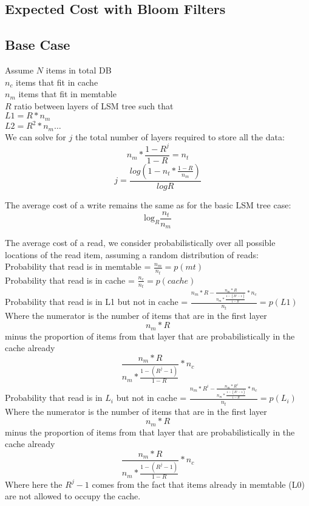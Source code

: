 \documentclass[11pt]{article}
\theoremstyle{plain}
\theoremstyle{definition}
\begin{document}
\subsection{Expected Cost with Bloom Filters}
\subsection{Base Case}

Assume
$N$ items in total DB \\
$n_c$ items that fit in cache\\
$n_m$ items that fit in memtable\\
$R$ ratio between layers of LSM tree such that \\
$L1 = R * n_m$ \\
$L2 = R^2 * n_m \dots$ \\ 

We can solve for $j$ the total number of layers required to store all the data: \\
$$n_m * \frac{1-R^j}{1-R} = n_t$$
$$j = \frac{log(1-n_t*\frac{1-R}{n_m})}{log R}$$

The average cost of a write remains the same as for the basic LSM tree case:
$$
\textrm{log}_{R} \frac{n_t}{n_m}
$$

The average cost of a read, we consider probabilistically over all possible locations of the read item, assuming a random distribution of reads: \\
Probability that read is in memtable = $\frac{n_m}{n_t}  = p(mt)$\\
Probability that read is in cache = $\frac{n_c}{n_t} = p(cache)$ \\
Probability that read is in L1 but not in cache = $ \frac{n_m * R - \frac{n_m * R}{n_m * \frac{1-(R^j-1)}{1-R}} * n_c}{n_t}  = p(L1)$\\
Where the numerator is the number of items that are in the first layer $$n_m * R$$ minus the proportion of items from that layer that are probabilistically in the cache already $$\frac{n_m * R}{n_m * \frac{1-(R^j-1)}{1-R}} * n_c$$
Probability that read is in $L_i$ but not in cache = $ \frac{n_m * R^i - \frac{n_m * R^i}{n_m * \frac{1-(R^j-1)}{1-R}} * n_c}{n_t}  = p(L_i)$\\
Where the numerator is the number of items that are in the first layer $$n_m * R$$ minus the proportion of items from that layer that are probabilistically in the cache already $$\frac{n_m * R}{n_m * \frac{1-(R^j-1)}{1-R}} * n_c$$
Where here the $R^j -1$ comes from the fact that items already in memtable (L0) are not allowed to occupy the cache.
\end{document}
